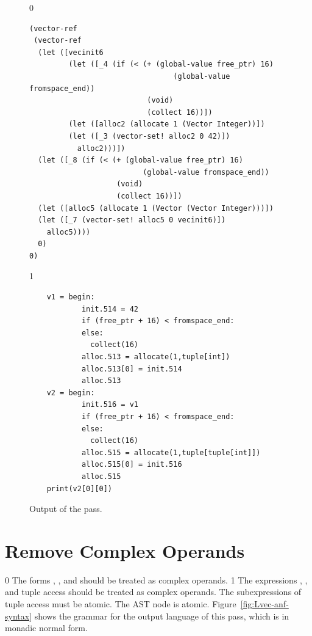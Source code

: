 \documentclass[7x10]{TimesAPriori_MIT}%
\def\racketEd{0}
\def\pythonEd{1}
\def\edition{1}
\newcommand{\pythonColor}[0]{}
\numberwithin{theorem}{chapter}
\numberwithin{definition}{chapter}
\numberwithin{equation}{chapter}
\begin{document}
\begin{figure}[tbp]
  \begin{tcolorbox}[colback=white]
{\if\edition\racketEd
\begin{lstlisting}
(vector-ref
 (vector-ref
  (let ([vecinit6
         (let ([_4 (if (< (+ (global-value free_ptr) 16)
                                 (global-value fromspace_end))
                           (void)
                           (collect 16))])
         (let ([alloc2 (allocate 1 (Vector Integer))])
         (let ([_3 (vector-set! alloc2 0 42)])
           alloc2)))])
  (let ([_8 (if (< (+ (global-value free_ptr) 16)
                          (global-value fromspace_end))
                    (void)
                    (collect 16))])
  (let ([alloc5 (allocate 1 (Vector (Vector Integer)))])
  (let ([_7 (vector-set! alloc5 0 vecinit6)])
    alloc5))))
  0)
0)
\end{lstlisting}
\fi}
{\if\edition\pythonEd\pythonColor
\begin{lstlisting}
    v1 = begin:
            init.514 = 42
            if (free_ptr + 16) < fromspace_end:
            else:
              collect(16)
            alloc.513 = allocate(1,tuple[int])
            alloc.513[0] = init.514
            alloc.513
    v2 = begin:
            init.516 = v1
            if (free_ptr + 16) < fromspace_end:
            else:
              collect(16)
            alloc.515 = allocate(1,tuple[tuple[int]])
            alloc.515[0] = init.516
            alloc.515
    print(v2[0][0])
\end{lstlisting}
\fi}
  \end{tcolorbox}
\caption{Output of the  pass.}
\label{fig:expose-alloc-output}
\end{figure}


\section{Remove Complex Operands}
\label{sec:remove-complex-opera-Lvec}

{\if\edition\racketEd
%
The forms , , and 
should be treated as complex operands.
%
\fi}
%
{\if\edition\pythonEd\pythonColor
%
The expressions , ,
and tuple access should be treated as complex operands.  The
subexpressions of tuple access must be atomic.
The  AST node is atomic.
%
\fi}
Figure~\ref{fig:Lvec-anf-syntax}
shows the grammar for the output language \LangAllocANF{} of this
pass, which is \LangAlloc{} in monadic normal form.
\end{document}
